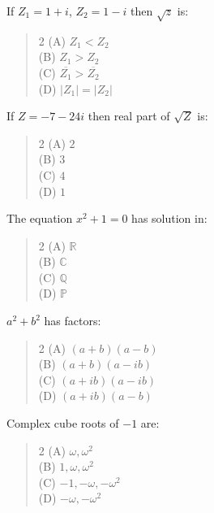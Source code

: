 \documentclass[11pt,a4paper]{article}
\begin{document}
\begin{mcqlist}
\item If $Z_1=1+i$, $Z_2=1-i$ then $\sqrt{z}$ is:
\begin{quote}\begin{multicols}{2}
\noindent (A) $Z_1<Z_2$ \\
(B) $Z_1>Z_2$ \\
(C) $\overline{Z_1}>\overline{Z_2}$ \\
(D) $|Z_1|=|Z_2|$
\end{multicols}\end{quote}

\item If $Z=-7-24i$ then real part of $\sqrt Z$ is:
\begin{quote}\begin{multicols}{2}
\noindent (A) $2$ \\
(B) $3$ \\
(C) $4$ \\
(D) $1$
\end{multicols}\end{quote}

\item The equation $x^2+1=0$ has solution in:
\begin{quote}\begin{multicols}{2}
\noindent (A) $\mathbb R$ \\
(B) $\mathbb C$ \\
(C) $\mathbb Q$ \\
(D) $\mathbb P$
\end{multicols}\end{quote}

\item $a^2+b^2$ has factors:
\begin{quote}\begin{multicols}{2}
\noindent (A) $(a+b)(a-b)$ \\
(B) $(a+b)(a-ib)$ \\
(C) $(a+ib)(a-ib)$ \\
(D) $(a+ib)(a-b)$
\end{multicols}\end{quote}

\item Complex cube roots of $-1$ are:
\begin{quote}\begin{multicols}{2}
\noindent (A) $\omega,\omega^2$ \\
(B) $1,\omega,\omega^2$ \\
(C) $-1,-\omega,-\omega^2$ \\
(D) $-\omega,-\omega^2$
\end{multicols}\end{quote}


\end{mcqlist}
\end{document}
